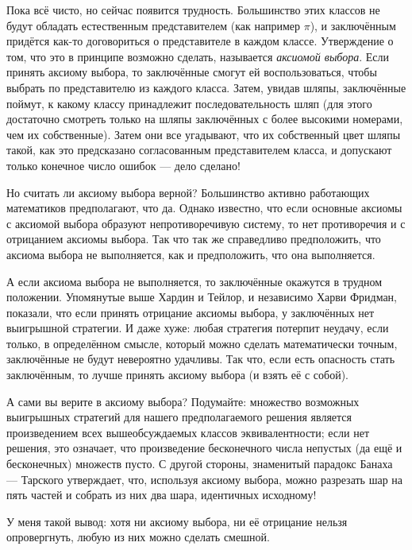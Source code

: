 Пока всё чисто, но сейчас появится трудность.
Большинство этих классов не будут обладать естественным представителем (как например $\pi$),
и заключённым придётся как-то договориться о представителе в каждом классе.
Утверждение о том, что это в принципе возможно сделать, называется \emph{аксиомой выбора}.
Если принять аксиому выбора, то заключённые смогут ей воспользоваться, чтобы выбрать по представителю из каждого класса.
Затем, увидав шляпы, заключённые поймут, к какому классу принадлежит последовательность шляп (для этого достаточно смотреть только на шляпы заключённых с более высокими номерами, чем их собственные).
Затем они все угадывают, что их собственный цвет шляпы такой, как это предсказано согласованным представителем класса, и допускают только конечное число ошибок --- дело сделано!

Но считать ли аксиому выбора верной?
Большинство активно работающих математиков предполагают, что да.
Однако известно, что если основные аксиомы с аксиомой выбора образуют непротиворечивую систему, то нет противоречия и с отрицанием аксиомы выбора.
Так что так же справедливо предположить, что аксиома выбора не выполняется, как и предположить, что она выполняется.

А если аксиома выбора не выполняется, то заключённые окажутся в трудном положении.
Упомянутые выше Хардин и Тейлор, и независимо Харви Фридман, показали, что если принять отрицание аксиомы выбора, у заключённых нет выигрышной стратегии.
И даже хуже: любая стратегия потерпит неудачу, если только, в определённом смысле, который можно сделать математически точным, заключённые не будут невероятно удачливы.
Так что, если есть опасность стать заключённым, то лучше принять аксиому выбора (и взять её с собой).

А сами вы верите в аксиому выбора?
Подумайте: множество возможных выигрышных стратегий для нашего предполагаемого решения является произведением всех вышеобсуждаемых классов эквивалентности; если нет решения, это означает, что произведение бесконечного числа непустых (да ещё и бесконечных) множеств пусто.
С другой стороны, знаменитый парадокс Банаха --- Тарского утверждает, что, используя аксиому выбора, можно разрезать шар на пять частей и собрать из них два шара, идентичных исходному!

У меня такой вывод: хотя ни аксиому выбора, ни её отрицание нельзя опровергнуть, любую из них можно сделать смешной.

% 

